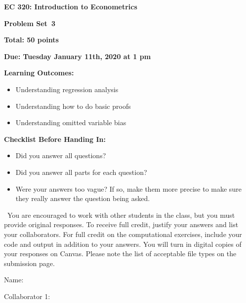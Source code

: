 \documentclass[11pt]{article}
\begin{document}
\begin{onehalfspacing}

\begin{center}
\textbf{EC 320: Introduction to Econometrics} \bigskip

\textbf{Problem Set\bigskip\ 3}
\bigskip
\end{center}


\noindent \textbf{Total: 50 points}

\noindent \textbf{Due: Tuesday January 11th, 2020 at 1 pm}

\bigskip

\noindent \textbf{Learning Outcomes:}
\begin{itemize}
\item Understanding regression analysis  
\item Understanding how to do basic proofs
\item Understanding omitted variable bias
\end{itemize}

\bigskip


\noindent \textbf{Checklist Before Handing In:}
\begin{itemize}
\item Did you answer all questions?
\item Did you answer all parts for each question?
\item Were your answers too vague? If so, make them more precise to make sure they really answer the question being asked.
\end{itemize}

\bigskip

\ You are encouraged to work with other students in the class, but you must provide original responses. To receive full credit, justify your answers and list your collaborators. For full credit on the computational exercises, include your code and output in addition to your answers. You will turn in digital copies of your responses on Canvas. Please note the list of acceptable file types on the submission page.  \\
\vspace{0.1in}

Name: 			\\
\vspace{0.1in}

Collaborator 1: \\

\vspace{0.1in}


\end{onehalfspacing}
\end{document}

